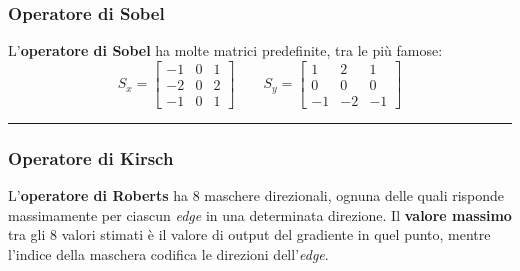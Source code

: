 \documentclass[a4paper]{article}
\newcommand{\longline}{\noindent\rule{\textwidth}{0.4pt}}
\begin{document}
	\subsubsection{Operatore di Sobel}
	
	L'\textcolor{Red3}{\textbf{operatore di Sobel}} ha molte matrici predefinite, tra le più famose:
	\begin{equation*}
		S_{x} = \begin{bmatrix}
			-1 & 0 & 1 \\
			-2 & 0 & 2 \\
			-1 & 0 & 1
		\end{bmatrix} \hspace{2em}
		S_{y} = \begin{bmatrix}
			1  & 2  & 1 \\
			0  & 0  & 0 \\
			-1 & -2 & -1
		\end{bmatrix}
	\end{equation*}
	
	\longline
	
	\subsubsection{Operatore di Kirsch}
	
	L'\textcolor{Red3}{\textbf{operatore di Roberts}} ha $8$ maschere direzionali, ognuna delle quali risponde massimamente per ciascun \emph{edge} in una determinata direzione. Il \textbf{valore massimo} tra gli $8$ valori stimati è il valore di output del gradiente in quel punto, mentre l'indice della maschera codifica le direzioni dell'\emph{edge}.\newline
	
\end{document}
